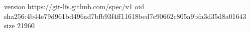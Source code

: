 version https://git-lfs.github.com/spec/v1
oid sha256:4b44e79d961bd496ad7bfb93f4ff11618bed7c90662c805a9bfa3d35d8a01643
size 21960
